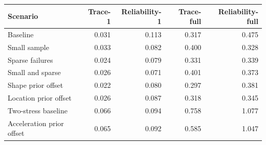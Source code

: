 \begin{tabular}{lrrrr}
\toprule
Scenario & Trace-1 & Reliability-1 & Trace-full & Reliability-full \\
\midrule
Baseline & 0.031 & 0.113 & 0.317 & 0.475 \\
Small sample & 0.033 & 0.082 & 0.400 & 0.328 \\
Sparse failures & 0.024 & 0.079 & 0.331 & 0.339 \\
Small and sparse & 0.026 & 0.071 & 0.401 & 0.373 \\
Shape prior offset & 0.022 & 0.080 & 0.297 & 0.381 \\
Location prior offset & 0.026 & 0.087 & 0.318 & 0.345 \\
Two-stress baseline & 0.066 & 0.094 & 0.758 & 1.077 \\
Acceleration prior offset & 0.065 & 0.092 & 0.585 & 1.047 \\
\bottomrule
\end{tabular}

